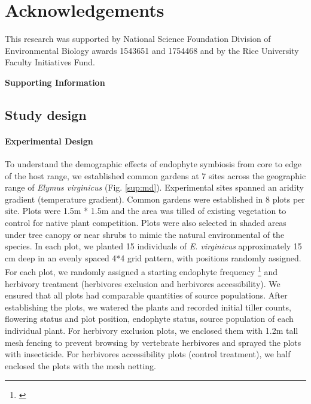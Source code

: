 \documentclass[12pt]{article}\usepackage[]{graphicx}\usepackage[dvipsnames]{xcolor}
\newcommand{\jacob}[2]{{\color{blue}{#1}}\footnote{\textit{\color{blue}{#2}}}}
\begin{document}
\section*{Acknowledgements}
This research was supported by National Science Foundation Division of Environmental Biology awards 1543651 and 1754468 and by the Rice University Faculty Initiatives Fund.



\newpage


\newpage
\clearpage 
\setcounter{equation}{0}
\setcounter{figure}{0}
\setcounter{section}{0}
\setcounter{table}{0}
\renewcommand{\theequation}{S.\arabic{equation}}
\renewcommand{\thetable}{S-\arabic{table}}
\renewcommand{\thefigure}{S-\arabic{figure}}
\renewcommand{\thesection}{S.\arabic{section}}

\centerline{\Large{\textbf{Supporting Information}}}
\subsection*{Study design}
\paragraph {Experimental Design} 
To understand the demographic effects of endophyte symbiosis from core to edge of the host range, we established  common gardens at 7 sites across the geographic range of \emph {Elymus virginicus} (Fig. \ref{sup:md}).
Experimental sites spanned an aridity gradient (temperature gradient).
Common gardens were established in 8 plots per site. 
Plots were 1.5m * 1.5m and the area was tilled of existing vegetation to control for native plant competition.
Plots were also selected in shaded areas under tree canopy or near shrubs to mimic the natural environmental of the species.
In each plot,  we planted 15 individuals  of \emph{E. virginicus} approximately 15 cm deep in an evenly spaced 4*4 grid pattern, with positions randomly assigned. 
For each plot, we randomly assigned a starting endophyte frequency  \jacob{(80\%, 60\%, 40\%, 20\%)}{Do we need a schematic of one replicate
of the experimental design?} and herbivory treatment (herbivores exclusion and herbivores accessibility). 
We ensured that all plots had comparable quantities of source populations.
After establishing the plots, we watered the plants and recorded initial tiller counts, flowering status and plot position,  endophyte status, source population of each individual plant. 
For herbivory exclusion plots, we enclosed them with 1.2m tall mesh fencing to prevent browsing by vertebrate herbivores and sprayed the plots with insecticide. 
For herbivores accessibility plots (control treatment), we half enclosed the plots with the mesh netting.
\end{document}
